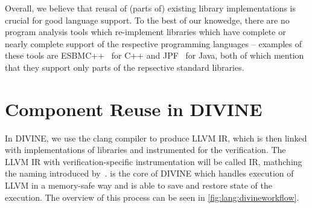 Overall, we believe that reusal of (parts of) existing library implementations is crucial for good language support.
To the best of our knowedge, there are no program analysis tools which
re-implement libraries which have complete or nearly complete support of the
respective programming languages -- examples of these tools are
ESBMC++~ for C++ and JPF~ for Java, both of
which mention that they support only parts of the repsective standard
libraries.

\section{Component Reuse in DIVINE}\label{sec:lang:divine}

In DIVINE, we use the clang compiler to produce LLVM IR, which is then linked
with implementations of libraries and instrumented for the verification.
The LLVM IR with verification-specific instrumentation will be called \divm IR,
mathching the naming introduced by~.
\divm is the core of DIVINE which handles execution of LLVM in a memory-safe
way and is able to save and restore state of the execution.
The overview of this process can be seen in \autoref{fig:lang:divineworkflow}.

